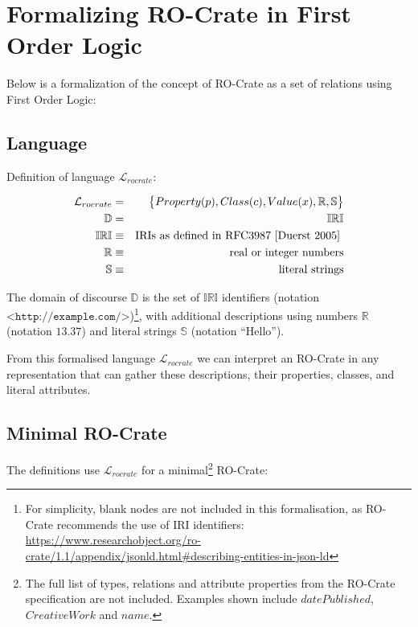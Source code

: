 \section{Formalizing RO-Crate in First Order Logic}
\label{ch5:formaldefinition}

Below is a formalization of the concept of RO-Crate as a set of relations using First Order Logic:

\subsection{Language}

Definition of language $\mathcal{L}_{rocrate}$:

\begin{eqnarray*}
    \mathcal{L}_{rocrate}   & = & \big\{ Property(p), Class(c),
                            Value(x), \mathbb{R}, \mathbb{S} \big\} \\
    \mathbb{D}              & = & \mathbb{IRI} \\
    \mathbb{IRI}            & \equiv & { \text{IRIs as defined in RFC3987 \cite{Duerst 2005} } } \\
    \mathbb{R}              & \equiv & { \text{real or integer numbers} } \\
    \mathbb{S}              & \equiv & { \text{literal strings} }
\end{eqnarray*}


The domain of discourse $\mathbb{D}$ is the set of $\mathbb{IRI}$ identifiers (notation $\texttt{<http://example.com/>}$)\footnote{
    For simplicity, blank nodes are not included in this formalisation, as RO-Crate
    recommends the use of IRI identifiers: \url{https://www.researchobject.org/ro-crate/1.1/appendix/jsonld.html\#describing-entities-in-json-ld}
}, with additional descriptions using numbers $\mathbb{R}$ (notation $13.37$) and literal strings $\mathbb{S}$ (notation $\text{“Hello”}$).

From this formalised language $\mathcal{L}_{rocrate}$ we can interpret an RO-Crate in any representation that can gather these descriptions, their properties, classes, and literal attributes.

\subsection{Minimal RO-Crate}

The definitions  use $\mathcal{L}_{rocrate}$ for a minimal\footnote{
    The full list of types, relations and attribute properties from the RO-Crate specification are not included. Examples shown include $datePublished$, $CreativeWork$ and $name$.
} RO-Crate:


